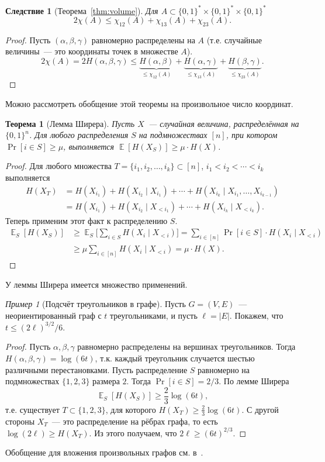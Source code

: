 \documentclass[12pt]{article}
\newcommand{\bits}{\{0,1\}}
\newcommand{\bitstr}{\bits^*}
\newcommand{\seqn}[2]{{#1}_1,{#1}_2,\dotsc,{#1}_{#2}}
\DeclareMathOperator*{\E}{\mathbb{E}}
\theoremstyle{definition}
\theoremstyle{plain}
\newtheorem{theorem}{Теорема}[section]
\newtheorem{corollary}{Следствие}[section]
\theoremstyle{remark}
\newtheorem{example}{Пример}[section]
\begin{document}
\begin{corollary}[Теорема~\ref{thm:volume}]
Для \(A\subset\bitstr\times\bitstr\times\bitstr\)
\[2\chi(A) \le \chi_{12}(A) + \chi_{13}(A) + \chi_{23}(A).\]
\end{corollary}
\begin{proof}
		Пусть $(\alpha,\beta,\gamma)$ равномерно распределены на $A$ (т.е. случайные величины~--- это координаты точек в
		множестве $A$).
    \[
        2\chi(A) = 2H(\alpha,\beta,\gamma)\le 
        \underbrace{H(\alpha,\beta) }_{\le\chi_{12}(A)} + 
        \underbrace{H(\alpha,\gamma)}_{\le\chi_{13}(A)} + 
        \underbrace{H(\beta,\gamma) }_{\le\chi_{23}(A)}.
    \]
\end{proof}
Можно рассмотреть обобщение этой теоремы на произвольное число координат.
\begin{theorem}[Лемма Ширера]
	Пусть $X$~--- случайная величина, распределённая на $\bits^n$.
	Для любого распределения $S$ на подмножествах $[n]$, при котором 
	$\Pr[i\in S]\ge\mu$, выполняется $\E[H(X_S)]\ge \mu\cdot H(X)$.
\end{theorem}
\begin{proof}
	Для любого множества $T=\{\seqn{i}{k}\}\subset [n]$, 
	$i_1<i_2<\dotsb<i_k$ выполняется
	\begin{align*}
		H(X_T) 
		&= H(X_{i_1}) + H(X_{i_2}\mid X_{i_1}) + \dotsb + H(X_{i_k}\mid X_{i_1}, \dotsc, X_{i_{k-1}})\\
		&= H(X_{i_1}) + H(X_{i_2}\mid X_{<i_1}) + \dotsb + H(X_{i_k}\mid X_{<i_k}).
	\end{align*}
	Теперь применим этот факт к распределению $S$.
	\begin{align*}
		\E_S[H(X_S)] 
		&\ge \E_S\biggl[\sum_{i\in S} H(X_i\mid X_{<i})\biggr]
		 = \sum_{i\in[n]}\Pr[i\in S]\cdot H(X_i\mid X_{<i})\\
		&\ge \mu\sum_{i \in [n]} H(X_i\mid X_{<i}) = \mu\cdot H(X).
	\end{align*}
\end{proof}
У леммы Ширера имеется множество применений. 
\begin{example}[Подсчёт треугольников в графе]
	Пусть $G=(V,E)$~--- неориентированный граф с $t$ треугольниками, и пусть $\ell = |E|$. Покажем, что $t\le
	(2\ell)^{3/2} / 6$.
	\begin{proof}
		Пусть $\alpha,\beta,\gamma$ равномерно распределены на вершинах треугольников. Тогда $H(\alpha,\beta,\gamma) =
		\log(6t)$, т.к. каждый треугольник случается шестью различными перестановками. Пусть распределение $S$
		равномерно на подмножествах $\{1,2,3\}$ размера $2$. Тогда $\Pr[i\in S] = 2/3$. По лемме Ширера 
	\[
		\E_S[H(X_S)]\ge\frac23\log(6t),
	\]
	т.е. существует $T\subset \{1,2,3\}$, для которого $H(X_T)\ge \frac23 \log(6t)$.
	С другой стороны $X_T$~--- это распределение на рёбрах графа, то есть $\log(2\ell)\ge H(X_T)$. Из этого получаем,
	что $2\ell \ge (6t)^{2/3}$.
	\end{proof}
	Обобщение для вложения произвольных графов см. в~\cite{rao10}.
\end{example}
\end{document}
